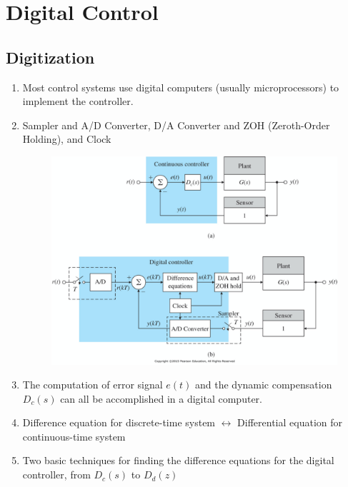 \documentclass[landscape,14pt]{oblivoir}
\begin{document}
    \baselineskip 20pt
    \thispagestyle{empty}

%
\setcounter{chapter}{7}

\setcounter{section}{0}
\chapter{Digital Control} 
%
\section{Digitization}
\begin{enumerate}
	\item Most control systems use digital computers (usually microprocessors) to implement the controller. 
	\item Sampler and A/D Converter, D/A Converter and ZOH (Zeroth-Order Holding), and Clock
	\begin{figure}[h]
		\includegraphics[width=12cm]{./FIG_Franklin/fig8-1.png}
	\end{figure}
%
\newpage
%
	\item The computation of error signal $e(t)$ and the dynamic compensation $D_c(s)$ can all be accomplished in a digital computer. 
	\item Difference equation for discrete-time system $\leftrightarrow$ Differential equation for continuous-time system 
	\item Two basic techniques for finding the difference equations for the digital controller, from $D_c(s)$ to $D_d(z)$ 
	\begin{itemize}

\end{itemize}
\end{enumerate}
\end{document}
